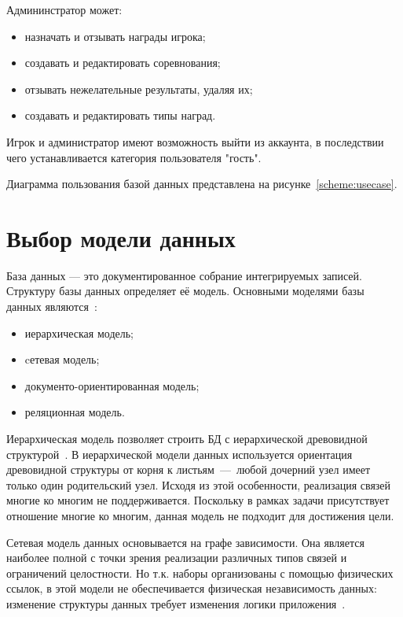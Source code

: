 Админинстратор может:
\begin{itemize}
	\item назначать и отзывать награды игрока;
	\item создавать и редактировать соревнования;
	\item отзывать нежелательные результаты, удаляя их;
	\item создавать и редактировать типы наград.
\end{itemize}

Игрок и администратор имеют возможность выйти из аккаунта, в последствии чего устанавливается категория пользователя "гость".

Диаграмма пользования базой данных представлена на рисунке~\ref{scheme:usecase}.


\section{Выбор модели данных}

База данных — это документированное собрание интегрируемых записей.
Структуру базы данных определяет её модель. Основными моделями базы данных являются~\cite{karpova,documentoriented}:
\begin{itemize}
	\item иерархическая модель;
	\item cетевая модель;
	\item документо-ориентированная модель;
	\item реляционная модель.
\end{itemize}

Иерархическая модель позволяет строить БД с иерархической древовидной структурой~\cite{karpova}. В иерархической модели данных используется ориентация древовидной
структуры от корня к листьям~---~любой дочерний узел имеет только один родительский узел. Исходя из этой особенности, реализация связей многие ко многим не поддерживается.
Поскольку в рамках задачи присутствует отношение многие ко многим, данная модель не подходит для достижения цели.

Сетевая модель данных основывается на графе зависимости. Она является наиболее полной с точки зрения реализации различных типов связей и ограничений целостности. Но т.к. наборы организованы с помощью физических ссылок, в этой модели не обеспечивается физическая независимость данных: изменение структуры данных требует изменения логики приложения~\cite{karpova}.

